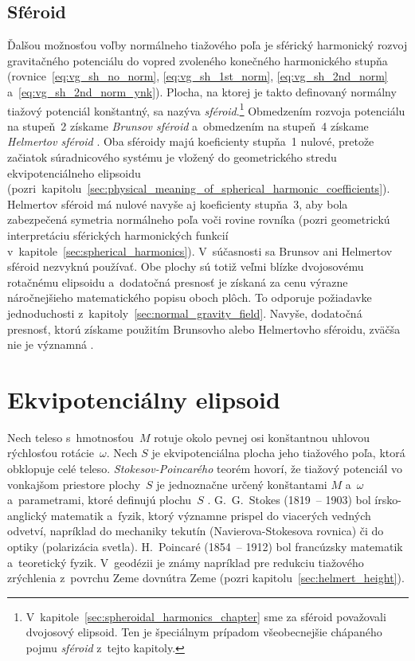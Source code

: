 \documentclass[a4paper, 12pt]{book}
\begin{document}
\subsection{Sféroid}
\label{sec:normal_field_spheroid}

Ďalšou možnosťou voľby normálneho tiažového poľa je sférický harmonický rozvoj 
gravitačného potenciálu do vopred zvoleného konečného harmonického stupňa 
(rovnice~\ref{eq:vg_sh_no_norm}, \ref{eq:vg_sh_1st_norm}, 
\ref{eq:vg_sh_2nd_norm} a~\ref{eq:vg_sh_2nd_norm_ynk}).  Plocha, na ktorej je 
takto definovaný normálny tiažový potenciál konštantný, sa nazýva 
\emph{sféroid}.\footnote{V~kapitole~\ref{sec:spheroidal_harmonics_chapter} sme 
za sféroid považovali dvojosový elipsoid.  Ten je špeciálnym prípadom 
všeobecnejšie chápaného pojmu \emph{sféroid} z~tejto kapitoly.}  Obmedzením 
rozvoja potenciálu na stupeň~2 získame \emph{Brunsov sféroid} a~obmedzením na 
stupeň~4 získame \emph{Helmertov sféroid} \parencite{Moritz1967}.  Oba sféroidy 
majú koeficienty stupňa~1 nulové, pretože začiatok súradnicového systému je 
vložený do geometrického stredu ekvipotenciálneho elipsoidu 
(pozri~kapitolu~\ref{sec:physical_meaning_of_spherical_harmonic_coefficients}).  
Helmertov sféroid má nulové navyše aj koeficienty stupňa~3, aby bola 
zabezpečená symetria normálneho poľa voči rovine rovníka (pozri geometrickú 
interpretáciu sférických harmonických funkcií 
v~kapitole~\ref{sec:spherical_harmonics}).   V~súčasnosti sa Brunsov ani 
Helmertov sféroid nezvyknú používať.  Obe plochy sú totiž veľmi blízke 
dvojosovému rotačnému elipsoidu a~dodatočná presnosť je získaná za cenu výrazne 
náročnejšieho matematického popisu oboch plôch.  To odporuje požiadavke 
jednoduchosti z~kapitoly~\ref{sec:normal_gravity_field}.  Navyše, dodatočná 
presnosť, ktorú získame použitím Brunsovho alebo Helmertovho sféroidu, zväčša 
nie je významná \parencite{Moritz1967}.



\section{Ekvipotenciálny elipsoid}
\label{sec:equipotential_ellipsoid}

Nech teleso s~hmotnosťou~$M$ rotuje okolo pevnej osi konštantnou uhlovou 
rýchlosťou rotácie~$\omega$.  Nech $S$ je ekvipotenciálna plocha jeho tiažového 
poľa, ktorá obklopuje celé teleso.  \emph{Stokesov-Poincarého} teorém hovorí, 
že tiažový potenciál vo vonkajšom priestore plochy~$S$ je jednoznačne určený 
konštantami $M$ a~$\omega$ a~parametrami, ktoré definujú plochu~$S$ 
\parencite{TorgeGeodesy}.  G.~G.~Stokes (1819~-- 1903) bol írsko-anglický 
matematik a~fyzik, ktorý významne prispel do viacerých vedných odvetví, 
napríklad do mechaniky tekutín (Navierova-Stokesova rovnica) či do optiky 
(polarizácia svetla).  H.~Poincaré (1854~-- 1912) bol francúzsky matematik 
a~teoretický fyzik.  V~geodézii je známy napríklad pre redukciu tiažového 
zrýchlenia z~povrchu Zeme dovnútra Zeme (pozri 
kapitolu~\ref{sec:helmert_height}).
\end{document}
